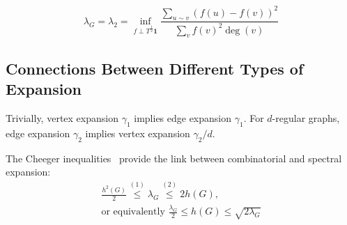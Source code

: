 \begin{equation}
    \lambda_G=\lambda_2=\inf_{f \perp T^{\frac{1}{2}}\mathbf{1}}
    \frac{\sum_{u \sim v}{(f(u)-f(v))^2}}{\sum_{v}{f(v)^2\deg(v)}}
\end{equation}

%
%

\subsection{Connections Between Different Types of Expansion}

Trivially, vertex expansion $\gamma_1$ implies edge expansion $\gamma_1$.
For $d$-regular graphs, edge expansion $\gamma_2$ implies vertex expansion $\gamma_2/d$.

The Cheeger inequalities~\cite{che69,hlw06,chu07} provide the link
between combinatorial and spectral expansion:
\begin{gather}
    \label{eq:cheeger-inequalities}
    \frac{h^2(G)}{2}\overset{(1)}{\leq}\lambda_G\overset{(2)}{\leq}2h(G),\\
    \text{or equivalently }\frac{\lambda_G}{2}\leq h(G)\leq\sqrt{2\lambda_G}
\end{gather}

